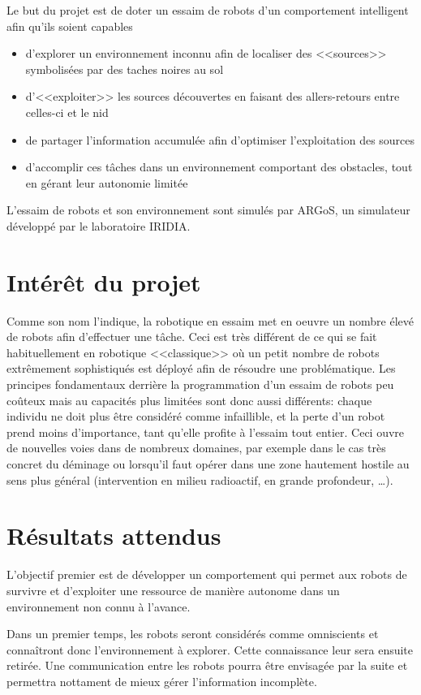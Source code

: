 Le but du projet est de doter un essaim de robots d'un comportement intelligent afin qu'ils soient capables \cite{cahierCharges}
\begin{itemize}
  \item d'explorer un environnement inconnu afin de localiser des <<sources>> symbolisées par des taches noires au sol
  \item d'<<exploiter>> les sources découvertes en faisant des allers-retours entre celles-ci et le nid
  \item de partager l'information accumulée afin d'optimiser l'exploitation des sources
  \item d'accomplir ces tâches dans un environnement comportant des obstacles, tout en gérant leur autonomie limitée
\end{itemize}
L'essaim de robots et son environnement sont simulés par ARGoS, un simulateur développé par le laboratoire IRIDIA.

\section{Intérêt du projet}

Comme son nom l'indique, la robotique en essaim met en oeuvre un nombre élevé de robots afin d'effectuer une tâche. Ceci est très différent de ce qui se fait habituellement en robotique <<classique>> où un petit nombre de robots extrêmement sophistiqués est déployé afin de résoudre une problématique. Les principes fondamentaux derrière la programmation d'un essaim de robots peu coûteux mais au capacités plus limitées sont donc aussi différents: chaque individu ne doit plus être considéré comme infaillible, et la perte d'un robot prend moins d'importance, tant qu'elle profite à l'essaim tout entier. Ceci ouvre de nouvelles voies dans de nombreux domaines, par exemple dans le cas très concret du déminage ou lorsqu'il faut opérer dans une zone hautement hostile au sens plus général (intervention en milieu radioactif, en grande profondeur, \ldots).~\cite{swarmMini}

\section{Résultats attendus}

L'objectif premier est de développer un comportement qui permet aux robots de survivre et d'exploiter une ressource de manière autonome dans un environnement non connu à l'avance.

Dans un premier temps, les robots seront considérés comme omniscients et connaîtront donc l'environnement à explorer. Cette connaissance leur sera ensuite retirée. Une communication entre les robots pourra être envisagée par la suite et permettra nottament de mieux gérer l'information incomplète.

